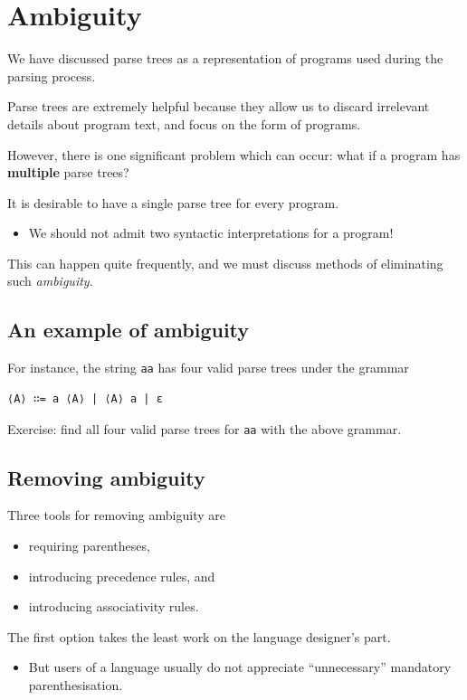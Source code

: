 \documentclass[11pt]{article}
\theoremstyle{definition}
\begin{document}
\section{Ambiguity}
\label{sec:org5846edf}
We have discussed parse trees as a representation
of programs used during the parsing process.

Parse trees are extremely helpful because they allow us
to discard irrelevant details about program text,
and focus on the form of programs.

However, there is one significant problem which can occur:
what if a program has \textbf{multiple} parse trees?

It is desirable to have a single parse tree for every program.
\begin{itemize}
\item We should not admit two syntactic interpretations for a program!
\end{itemize}

This can happen quite frequently, and we must discuss
methods of eliminating such \emph{ambiguity}.

\subsection{An example of ambiguity}
\label{sec:orgf5fa90c}
For instance, the string \texttt{aa} has four valid parse trees
under the grammar
\begin{verbatim}
⟨A⟩ ∷= a ⟨A⟩ | ⟨A⟩ a | ε 
\end{verbatim}

Exercise: find all four valid parse trees for \texttt{aa} with the above
grammar.

\subsection{Removing ambiguity}
\label{sec:org809ed05}
Three tools for removing ambiguity are
\begin{itemize}
\item requiring parentheses,
\item introducing precedence rules, and
\item introducing associativity rules.
\end{itemize}

The first option takes the least work on the language designer's part.
\begin{itemize}
\item But users of a language usually do not appreciate
“unnecessary” mandatory parenthesisation.
\end{itemize}
\end{document}
